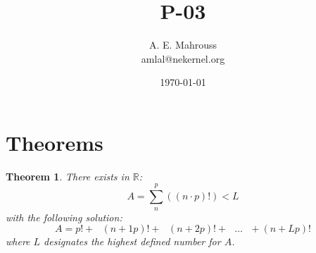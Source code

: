 \documentclass{article}
\title{P-03}
\author{A. E. Mahrouss\\amlal@nekernel.org}
\date{\today}
\theoremstyle{plain}
\newtheorem{theorem}{Theorem}[section]
\theoremstyle{definition}
\theoremstyle{remark}
\begin{document}
\maketitle

\section{Theorems}

\begin{theorem}
There exists in $\mathbb{R}$:
\begin{equation}
    A=\sum_{n}^{p} ((n \cdot p)!) < L
\end{equation}
with the following solution:
\begin{equation}
    A = p! + \text{ } (n+1p)! + \text{ } (n+2p)! + \text{ } \dots \text{ }+ (n+Lp)! 
\end{equation}
where $L$ designates the highest defined number for $A$.
\end{theorem}
\end{document}
